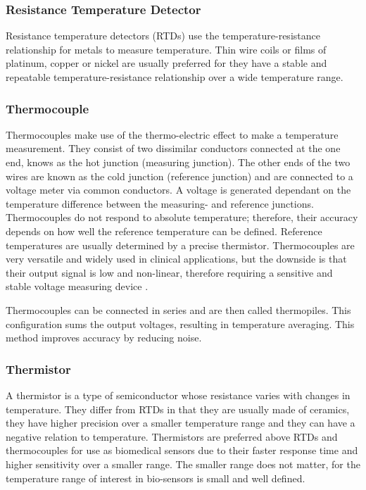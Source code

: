 \subsubsection{Resistance Temperature Detector}

Resistance temperature detectors (RTDs) use the temperature-resistance relationship for metals to measure temperature. Thin wire coils or films of platinum, copper or nickel are usually preferred for they have a stable and repeatable temperature-resistance relationship over a wide temperature range.

\subsubsection{Thermocouple}
Thermocouples make use of the thermo-electric effect to make a temperature measurement. They consist of two dissimilar conductors connected at the one end, knows as the hot junction (measuring junction). The other ends of the two wires are known as the cold junction (reference junction) and are connected to a voltage meter via common conductors. A voltage is generated dependant on the temperature difference between the measuring- and reference junctions. Thermocouples do not respond to absolute temperature; therefore, their accuracy depends on how well the reference temperature can be defined. Reference temperatures are usually determined by a precise thermistor. Thermocouples are very versatile and widely used in clinical applications, but the downside is that their output signal is low and non-linear, therefore requiring a sensitive and stable voltage measuring device \citep{jones2010biomedical}.

\medskip

Thermocouples can be connected in series and are then called thermopiles. This configuration sums the output voltages, resulting in temperature averaging. This method improves accuracy by reducing noise. 

\subsubsection{Thermistor}
A thermistor is a type of semiconductor whose resistance varies with changes in temperature. They differ from RTDs in that they are usually made of ceramics, they have higher precision over a smaller temperature range and they can have a negative relation to temperature. Thermistors are preferred above RTDs and thermocouples for use as biomedical sensors due to their faster response time and higher sensitivity over a smaller range. The smaller range does not matter, for the temperature range of interest in bio-sensors is small and well defined. 

